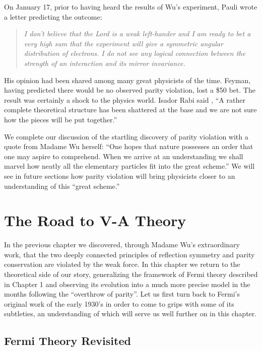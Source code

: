 \documentclass[12pt]{book}
\begin{document}
On January 17, prior to having heard the results of Wu's experiment, Pauli wrote a letter predicting the outcome\cite{pauli;letter}:

\begin{quote}
\textit{
I don't believe that the Lord is a weak left-hander and I am ready to bet a very high sum that the experiment will give a symmetric angular distribution of electrons. I do not see any logical connection between the strength of an interaction and its mirror invariance.
}
\end{quote}

His opinion had been shared among many great physicists of the time. Feyman, having predicted there would be no observed parity violation, lost a \$50 bet. The result was certainly a shock to the physics world. Isador Rabi said \cite{gardner}, ``A rather complete theoretical structure has been shattered at the base and we are not sure how the pieces will be put together.''

We complete our discussion of the startling discovery of parity violation with a quote from Madame Wu herself: ``One hopes that nature possesses an order that one may aspire to comprehend. When we arrive at an understanding we shall marvel how neatly all the elementary particles fit into the great scheme.'' We will see in future sections how parity violation will bring physicists closer to an understanding of this ``great scheme.''

\chapter{The Road to V-A Theory}

In the previous chapter we discovered, through Madame Wu's extraordinary work, that the two deeply connected principles of reflection symmetry and parity conservation are violated by the weak force. In this chapter we return to the theoretical side of our story, generalizing the framework of Fermi theory described in Chapter 1 and observing its evolution into a much more precise model in the months following the ``overthrow of parity''. Let us first turn back to Fermi's original work of the early 1930's in order to come to grips with some of its subtleties, an understanding of which will serve us well further on in this chapter.

\section{Fermi Theory Revisited}
\end{document}
